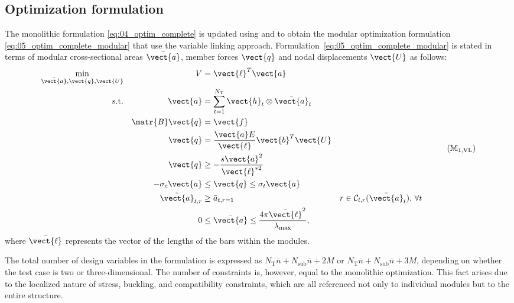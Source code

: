 \subsection{Optimization formulation} \label{sec:05_opt_formulation}
The monolithic formulation \ref{eq:04_optim_complete} is updated using  and  to obtain the modular optimization formulation \ref{eq:05_optim_complete_modular} that use the variable linking approach. Formulation~\ref{eq:05_optim_complete_modular} is stated in terms of modular cross-sectional areas $\bar{\vect{a}}$, member forces $\vect{q}$ and nodal displacements $\vect{U}$ as follows:
\begin{equation}
    \begin{aligned}
    \min_{\bar{\vect{a}}, \vect{q}, \vect{U}}   && V &= \vect{\ell}^{T}\vect{a}\\
    \textrm{s.t.}  && \vect{a} &= \sum_{t=1}^{N_\text{T}} \vect{h}_t\otimes\bar{\vect{a}}_t \\ 
    && \matr{B}\vect{q} &= \vect{f} && \\
    && \vect{q} &= \frac{\vect{a}E}{\vect{\ell}}\vect{b}^T\vect{U} &&  \\
    && \vect{q} &\geq -\frac{s\vect{a}^2}{\vect{\ell}^{*2}} &&  \\
    && -\sigma_c\vect{a} &\leq \vect{q} \leq \sigma_t\vect{a} &&  \\
    && \bar{\vect{a}}_{t,r}&\geq \bar{a}_{t,r=1} && r \in \mathcal{C}_{l,r}(\bar{\vect{a}}_t),\, \forall t \\
    && 0 &\leq \bar{\vect{a}} \leq \frac{4 \pi \bar{\vect{\ell}}^2}{\lambda_{\text{max}}}, \\
    \end{aligned}
    \tag{${\mathbb{M}}_\text{1,VL}$}
    \label{eq:05_optim_complete_modular}
\end{equation}
where $\bar{\vect{\ell}}$ represents the vector of the lengths of the bars within the modules.

The total number of design variables in the formulation is expressed as $N_\text{T}\bar{n} + N_{\text{sub}}\bar{n} + 2M$ or $N_\text{T}\bar{n} + N_{\text{sub}}\bar{n} + 3M$, depending on whether the test case is two or three-dimensional. The number of constraints is, however, equal to the monolithic optimization. This fact arises due to the localized nature of stress, buckling, and compatibility constraints, which are all referenced not only to individual modules but to the entire structure.


